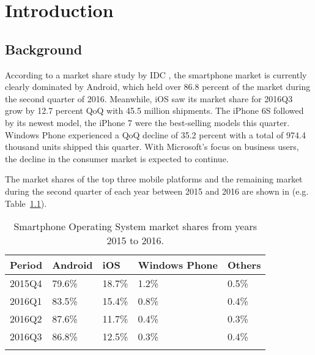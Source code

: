 \chapter{Introduction} %

\label{Chapter1} %


\newcommand{\keyword}[1]{\textbf{#1}}
\newcommand{\tabhead}[1]{\textbf{#1}}
\newcommand{\code}[1]{\texttt{#1}}
\newcommand{\file}[1]{\texttt{\bfseries#1}}
\newcommand{\option}[1]{\texttt{\itshape#1}}


\section{Background}

According to a market share study by IDC \parencite{Reference1}, the smartphone market is
currently clearly dominated by Android, which held over 86.8 percent of the
market during the second quarter of 2016. Meanwhile, iOS saw its market share for 2016Q3 grow by 12.7 percent QoQ with 45.5 million shipments.
The iPhone 6S followed by its newest model, the iPhone 7 were the best-selling models this quarter.
Windows Phone experienced a QoQ decline of 35.2 percent  with a total of 974.4 thousand units shipped this quarter.
With Microsoft’s focus on business users, the decline in the consumer market is expected to continue.

The market shares of the top three mobile platforms and the remaining market during the second
quarter of each year between 2015 and 2016 are shown in (e.g. Table~\ref{tab:SmartphoneOSMarketShares}).

\begin{table}
\caption{Smartphone Operating System market shares from years 2015 to 2016.}
\label{tab:SmartphoneOSMarketShares}
\centering
\begin{tabular}{l l l l l}
\toprule
\tabhead{Period} & \tabhead{Android} & \tabhead{iOS} & \tabhead{Windows Phone} & \tabhead{Others}\\
\midrule
2015Q4 & 79.6\% &18.7\% & 1.2\% &0.5\%\\
2016Q1 &83.5\%&15.4\%&0.8\%&0.4\% \\
2016Q2 &87.6\%&11.7\%&0.4\%&0.3\% \\
2016Q3 &86.8\%&12.5\%&0.3\%&0.4\%  \\
\bottomrule\\
\end{tabular}
\end{table}

